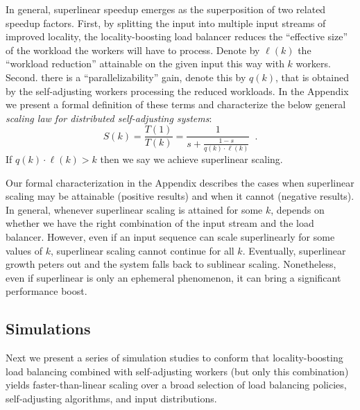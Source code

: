 In general, superlinear speedup emerges as the superposition of two related speedup factors. First, by splitting the input into multiple input streams of improved locality, the locality-boosting load balancer reduces the ``effective size'' of the workload the workers will have to process. Denote by $\ell(k)$ the ``workload reduction'' attainable on the given input this way with $k$ workers. Second. there is a ``parallelizability'' gain, denote this by $q(k)$, that is obtained by the self-adjusting workers processing the reduced workloads.  In the Appendix we present a formal definition of these terms and characterize the below general \emph{scaling law for distributed self-adjusting systems}:
\begin{displaymath}
    S(k) = \frac{T(1)}{T(k)} = \frac{1}{s + \frac{1-s}{q(k) \cdot \ell(k)}} \enspace .
\end{displaymath}
If $q(k) \cdot \ell(k) > k$ then we say we achieve superlinear scaling.

Our formal characterization in the Appendix describes the cases when superlinear scaling may be attainable (positive results) and when it cannot (negative results). In general, whenever superlinear scaling is attained for some $k$, depends on whether we have the right combination of the input stream and the load balancer.  However, even if an input sequence can scale superlinearly for some values of $k$, superlinear scaling cannot continue for all $k$. Eventually, superlinear growth peters out and the system falls back to sublinear scaling. Nonetheless, even if superlinear is only an ephemeral phenomenon, it can bring a significant performance boost.


\subsection{Simulations}
\label{sec:sims}

Next we present a series of simulation studies to conform that locality-boosting load balancing combined with self-adjusting workers (but only this combination) yields faster-than-linear scaling over a broad selection of load balancing policies, self-adjusting algorithms, and input distributions.

